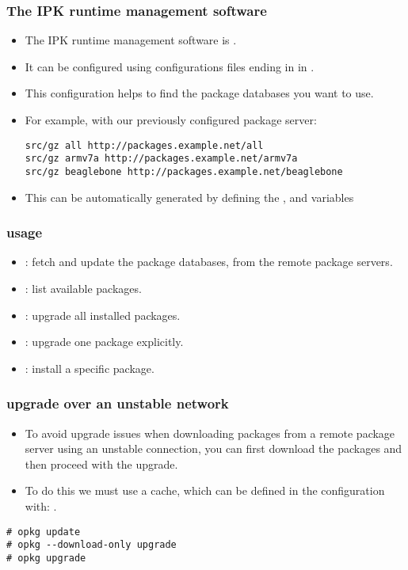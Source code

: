 \begin{frame}[fragile]
  \frametitle{The IPK runtime management software}
  \begin{itemize}
    \item The IPK runtime management software is .
    \item It can be configured using configurations files ending in
       in .
    \item This configuration helps  to find the package
      databases you want to use.
    \item For example, with our previously configured package server:
    \begin{block}{}
      \begin{verbatim}
src/gz all http://packages.example.net/all
src/gz armv7a http://packages.example.net/armv7a
src/gz beaglebone http://packages.example.net/beaglebone
      \end{verbatim}
    \end{block}
    \item This can be automatically generated by defining the
      , 
      and  variables
  \end{itemize}
\end{frame}

\begin{frame}
  \frametitle{ usage}
  \begin{itemize}
    \item {}: fetch and update the package
      databases, from the remote package servers.
    \item {}: list available packages.
    \item {}: upgrade all installed packages.
    \item {}: upgrade one package
      explicitly.
    \item {}: install a specific package.
  \end{itemize}
\end{frame}

\begin{frame}[fragile]
  \frametitle{ upgrade over an unstable network}
  \begin{itemize}
    \item To avoid upgrade issues when downloading packages from a
      remote package server using an unstable connection, you can
      first download the packages and then proceed with the upgrade.
    \item To do this we must use a cache, which can be defined in the
       configuration with:
      .
  \end{itemize}
  \begin{block}{}
    \begin{verbatim}
# opkg update
# opkg --download-only upgrade
# opkg upgrade
    \end{verbatim}
  \end{block}
\end{frame}
